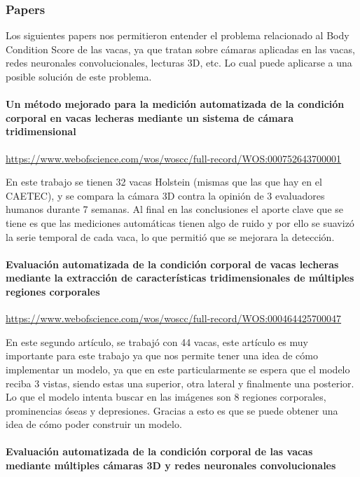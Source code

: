\subsubsection{Papers}

Los siguientes papers nos permitieron entender el problema relacionado al Body Condition Score de las vacas, ya que tratan sobre cámaras aplicadas en las vacas, redes neuronales convolucionales, lecturas 3D, etc. Lo cual puede aplicarse a una posible solución de este problema.

\paragraph{Un método mejorado para la medición automatizada de la condición corporal en vacas lecheras mediante un sistema de cámara tridimensional}

\url{https://www.webofscience.com/wos/woscc/full-record/WOS:000752643700001}

En este trabajo se tienen 32 vacas Holstein (mismas que las que hay en el CAETEC), y se compara la cámara 3D contra la opinión de 3 evaluadores humanos durante 7 semanas. Al final en las conclusiones el aporte clave que se tiene es que las mediciones automáticas tienen algo de ruido y por ello se suavizó la serie temporal de cada vaca, lo que permitió que se mejorara la detección.

\paragraph{Evaluación automatizada de la condición corporal de vacas lecheras mediante la extracción de características tridimensionales de múltiples regiones corporales}

\url{https://www.webofscience.com/wos/woscc/full-record/WOS:000464425700047}

En este segundo artículo, se trabajó con 44 vacas, este artículo es muy importante para este trabajo ya que nos permite tener una idea de cómo implementar un modelo, ya que en este particularmente se espera que el modelo reciba 3 vistas, siendo estas una superior, otra lateral y finalmente una posterior. Lo que el modelo intenta buscar en las imágenes son 8 regiones corporales, prominencias óseas y depresiones. Gracias a esto es que se puede obtener una idea de cómo poder construir un modelo.

\paragraph{Evaluación automatizada de la condición corporal de las vacas mediante múltiples cámaras 3D y redes neuronales convolucionales}


